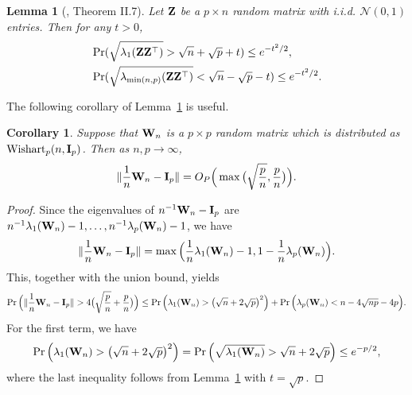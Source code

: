 \documentclass[times,sort&compress,3p]{elsarticle}
\theoremstyle{plain}
\newtheorem{corollary}{\quad\quad Corollary}
\newtheorem{lemma}{\quad\quad Lemma}
\theoremstyle{definition}
\theoremstyle{remark}
\begin{document}
\begin{appendices}
\begin{lemma}[\cite{DAVIDSON2001317}, Theorem II.7]\label{DSbound}
    Let $\mathbf{Z}$ be a $p\times n$ random matrix with i.i.d. $\mathcal{N}(0,1)$ entries.
    Then for any $t>0$,
    \begin{align*}
        &\Pr(\sqrt{\lambda_1(\mathbf{Z} \mathbf{Z}^\top  )}>\sqrt{n}+\sqrt{p}+t)\leq e^{-t^2/2},
        \\
        &\Pr(\sqrt{\lambda_{\min(n,p)}(\mathbf{Z} \mathbf{Z}^\top  )}<\sqrt{n}-\sqrt{p}-t)\leq e^{-t^2/2}.
    \end{align*}
\end{lemma}
    The following corollary of Lemma~\ref{DSbound} is useful.

\begin{corollary}\label{corNorm}
Suppose that $\mathbf{W}_n$ is a $p \times p$ random matrix which is distributed as $\mathrm{Wishart}_p(n,\mathbf{I}_{p})$.
    Then as $n,p\to \infty$,
$$
    \|\frac{1}{n}\mathbf{W}_n-\mathbf{I}_p\|=O_P\Big(\max\big(\sqrt{\frac{p}{n}},\frac{p}{n}\big)\Big).
$$
\end{corollary}
\begin{proof}
    Since the eigenvalues of $n^{-1}\mathbf{W}_n-\mathbf{I}_p$ are $n^{-1}\lambda_1(\mathbf{W}_n)-1,\ldots, n^{-1}\lambda_p(\mathbf{W}_n)-1$, we have
     $$\|\frac{1}{n}\mathbf{W}_n-\mathbf{I}_p\|=\max\Big(\frac{1}{n}\lambda_1(\mathbf{W}_n)-1,1-\frac{1}{n}\lambda_p(\mathbf{W}_n)\Big).$$
This, together with the union bound, yields
$$
    \Pr\Big(\|\frac{1}{n}\BW_n-\BI_p\|>4\big(\sqrt{\frac{p}{n}}+\frac{p}{n}\big)\Big)
    \leq
    \Pr\Big(\lambda_1(\BW_n)>\big(\sqrt{n}+2\sqrt{p}\big)^2\Big)+
    \Pr\Big(\lambda_p(\BW_n)<n-4\sqrt{np}-4p\Big).
$$
    For the first term, we have    $$
    \Pr\Big(\lambda_1(\mathbf{W}_n)>\big(\sqrt{n}+2\sqrt{p}\big)^2\Big)=
    \Pr\Big(\sqrt{\lambda_1(\mathbf{W}_n)}>\sqrt{n}+2\sqrt{p}\Big)\leq e^{-p/2},
    $$
 where the last inequality follows from Lemma~\ref{DSbound} with $t=\sqrt{p}$.


\end{proof}
\end{appendices}
\end{document}
